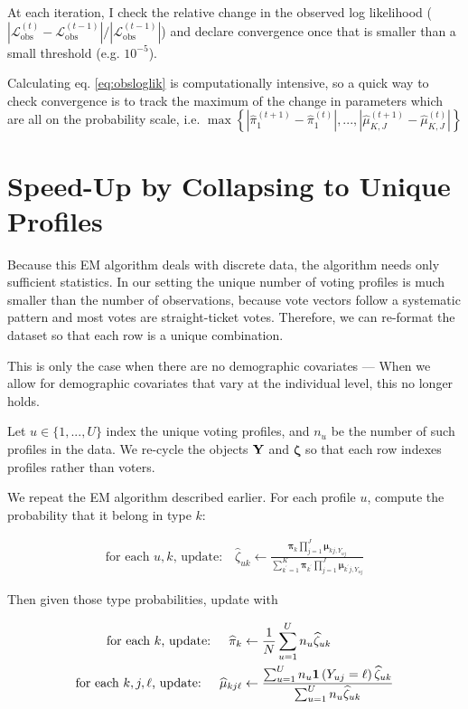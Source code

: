 \documentclass[11pt]{article}
\begin{document}
At each iteration, I check the relative change in the observed log likelihood (\(|\mathcal{L}_{\text{obs}}^{(t)} - \mathcal{L}_{\text{obs}}^{(t - 1)}| / |\mathcal{L}_{\text{obs}}^{(t - 1)}|\)) and declare convergence once that is smaller than a small threshold (e.g. \(10^{-5}\)).

Calculating eq. \ref{eq:obsloglik} is computationally intensive, so a quick way to check convergence is to track the maximum of the change in parameters which are all on the probability scale, i.e. \(\max\left\{|\widehat\pi^{(t + 1)}_{1} - \widehat\pi^{(t)}_{1}|, ..., |\widehat\mu^{(t + 1)}_{K,J} - \widehat\mu^{(t)}_{K,J}|\right\}\)

\section{Speed-Up by Collapsing to Unique Profiles}

Because this EM algorithm deals with discrete data, the algorithm needs only sufficient statistics. In our setting the unique number of voting profiles is much smaller than the number of observations, because vote vectors follow a systematic pattern and most votes are straight-ticket votes. Therefore, we can re-format the dataset so that each row is a unique combination.

This is only the case when there are no demographic covariates --- When we allow for demographic covariates that vary at the individual level, this no longer holds.

Let \(u \in \{1, ..., U\}\) index the unique voting profiles, and \(n_{u}\) be the number of such profiles in the data.  We re-cycle the objects \(\mathbf{Y}\) and \(\bm\zeta\) so that each row indexes profiles rather than voters.

We repeat the EM algorithm described earlier. For each profile \(u\), compute the probability that it belong in type \(k\):

\begin{align}
\text{for each \(u, k\), update: }~~~   \widehat\zeta_{uk} \leftarrow \frac{\bm{\pi}_{k}\prod^{J}_{j=1}\bm{\mu}_{kj,Y_{uj}}}
{\sum^{K}_{k^\prime=1}\bm{\pi}_{k^\prime}\prod^{J}_{j=1}\bm{\mu}_{k^\prime j,Y_{uj}}}
\end{align}

Then given those type probabilities, update with

\begin{align}
\text{for each \(k\), update: }~~~   \widehat{\pi}_{k} &\leftarrow \frac{1}{N}\sum^U_{u = 1}n_{u}\widehat{\zeta}_{uk}\label{eq:Mstep_theta}\\
\text{for each \(k, j, \ell\), update: }~~~   \widehat{\mu}_{kj\ell} &\leftarrow\frac{\sum^U_{u=1}n_{u}\bm{1}\left(Y_{uj} = \ell\right)\widehat{\zeta}_{uk}}{\sum^{U}_{u=1}n_{u}\widehat{\zeta}_{uk}}\label{eq:Mstep_mu}\\
\end{align}
\end{document}

